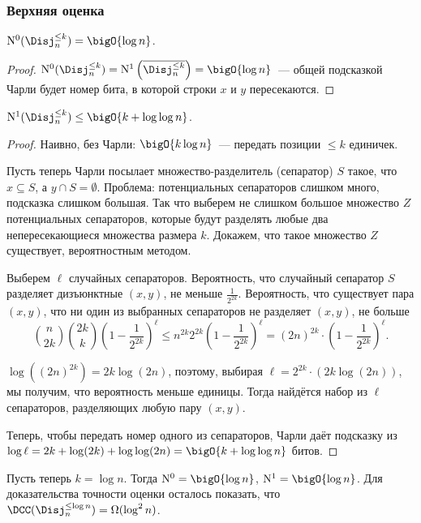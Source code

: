 \subsubsection{Верхняя оценка}

\begin{theorem}
    $\NCC{0}(\Disj^{\le k}_n) = \bigO{\log n}$.
\end{theorem}

\begin{proof}
    $\NCC{0}(\Disj^{\le k}_n) = \NCC{1}\left(\overline{\Disj^{\le k}_n}\right) = \bigO{\log n}$~--- общей
    подсказкой Чарли будет номер бита, в которой строки $x$ и $y$ пересекаются.
\end{proof}

\begin{theorem}
    $\NCC{1}(\Disj^{\le k}_n) \le \bigO{k + \log\log n}$.
\end{theorem}

\begin{proof}
    Наивно, без Чарли: $\bigO{k\log n}$~--- передать позиции $\le k$ единичек.

    Пусть теперь Чарли посылает множество-разделитель (сепаратор) $S$ такое, что $x \subseteq S$, а $y
    \cap S = \emptyset$. Проблема: потенциальных сепараторов слишком много, подсказка слишком
    большая. Так что выберем не слишком большое множество $Z$ потенциальных сепараторов, которые будут
    разделять любые два непересекающиеся множества размера $k$. Докажем, что такое множество $Z$
    существует, вероятностным методом.

    Выберем $\ell$ случайных сепараторов. Вероятность, что случайный сепаратор $S$ разделяет дизъюнктные
    $(x, y)$, не меньше $\frac{1}{2^{2k}}$. Вероятность, что существует пара $(x, y)$, что ни один из
    выбранных сепараторов не разделяет $(x, y)$, не больше
    $$
        \binom{n}{2k}\binom{2k}{k} \left(1 - \frac{1}{2^{2k}}\right)^{\ell} \le n^{2k} 2^{2k} \left(1 -
          \frac{1}{2^{2k}}\right)^{\ell} = (2n)^{2k} \cdot \left(1 - \frac{1}{2^{2k}}\right)^{\ell}.
    $$

    $\log((2n)^{2k}) = 2k\log(2n)$, поэтому, выбирая $\ell = 2^{2k} \cdot (2k \log(2n))$, мы получим, что
    вероятность меньше единицы. Тогда найдётся набор из $\ell$ сепараторов, разделяющих любую пару $(x,
    y)$.

    Теперь, чтобы передать номер одного из сепараторов, Чарли даёт подсказку из $\log \ell = 2k +
    \log(2k) + \log\log(2n) = \bigO{k + \log\log n}$ битов. 
\end{proof}

Пусть теперь $k = \log n$. Тогда $\NCC{0} = \bigO{\log n}$, $\NCC{1} = \bigO{\log n}$. Для доказательства
точности оценки осталось показать, что $\DCC(\Disj_n^{\le \log n}) = \Omega(\log^2 n)$. 